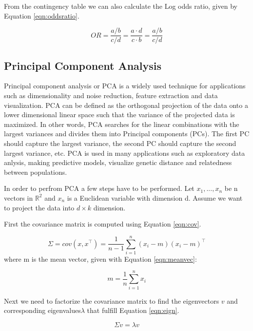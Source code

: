 From the contingency table we can also calculate the Log odds ratio, given by Equation \ref{eqn:oddsratio}.

\begin{equation}
    \label{eqn:oddsratio}
    OR = \frac{a/b}{c/d} = \frac{a\cdot d}{c \cdot b} = \frac{a/b}{c/d}
\end{equation}



\subsection{Principal Component Analysis}
Principal component analysis or PCA is a widely used technique for applications such as dimensionality and noise reduction, feature extraction and data visualization. PCA can be defined as the orthogonal projection of the data onto a lower dimensional linear space such that the variance of the projected data is maximized. In other words, PCA searches for the linear combinations with the largest variances and divides them into Principal components (PCs). The first PC should capture the largest variance, the second PC should capture the second largest variance, etc. PCA is used in many applications such as exploratory data anlysis, making predictive models, visualize genetic distance and relatedness between populations. %

In order to perfrom PCA a few steps have to be performed. Let $x_1,...,x_n$  be n vectors in $\mathbb{R}^2$ and $x_n$ is a Euclidean variable with dimension d. Assume we want to project the data into $d \times k$ dimension.

First the covariance matrix is computed using Equation \ref{eqn:cov}.

\begin{equation}
\label{eqn:cov}
\Sigma = cov(x, x^\intercal) = \frac{1}{n-1}\sum_{i = 1}^{n} (x_i - m)(x_i - m)^\intercal
\end{equation}
where m is the mean vector, given with Equation \ref{eqn:meanvec}:

\begin{equation}
\label{eqn:meanvec}
m = \frac{1}{n} \sum_{i = 1}^n x_i
\end{equation}

Next we need to factorize the covariance matrix to find the eigenvectors $v$ and corresponding eigenvalues$\lambda$ that fulfill Equation \ref{eqn:eign}.

\begin{equation}
\label{eqn:eign}
\Sigma v = \lambda v
\end{equation}

